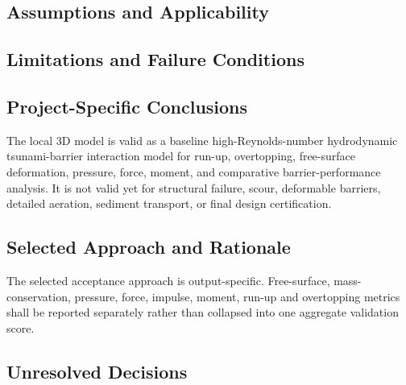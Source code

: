 \subsection{Assumptions and Applicability}
\label{sec:res-ver-met-assumptions}


\subsection{Limitations and Failure Conditions}
\label{sec:res-ver-met-limitations}


\subsection{Project-Specific Conclusions}
\label{sec:res-ver-met-conclusions}


The local 3D model is valid as a baseline high-Reynolds-number
hydrodynamic tsunami-barrier interaction model for run-up, overtopping,
free-surface deformation, pressure, force, moment, and comparative
barrier-performance analysis. It is not valid yet for structural
failure, scour, deformable barriers, detailed aeration, sediment
transport, or final design certification.

\subsection{Selected Approach and Rationale}
\label{sec:res-ver-met-selected-approach}


The selected acceptance approach is output-specific. Free-surface,
mass-conservation, pressure, force, impulse, moment, run-up and
overtopping metrics shall be reported separately rather than collapsed
into one aggregate validation score.

\subsection{Unresolved Decisions}
\label{sec:res-ver-met-unresolved-decisions}

